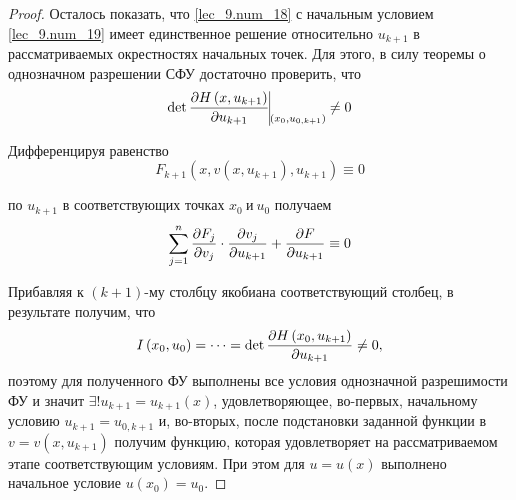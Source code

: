 \documentclass[../../main.tex]{subfiles}
\begin{document}
\begin{proof}
    Осталось показать, что \eqref{lec_9.num_18} с начальным
    условием \eqref{lec_9.num_19} имеет единственное решение относительно 
    $u_{k+1}$ в рассматриваемых окрестностях начальных
    точек. Для этого, в силу теоремы о однозначном разрешении СФУ
    достаточно проверить, что
    \begin{equation}
    \label{lec_9.num_20}
    \det\pderiv{H\left(x, u_{k+1}\right)}{u_{k+1}} 
    \vline\underset{\left(x_0, u_{0,k+1}\right)}{} \neq 0
    \end{equation}
    
    Дифференцируя равенство
    \begin{equation}
    \label{lec_9.num_21}
    F_{k+1}\left(x, v\left(x, u_{k+1}\right), 
    u_{k+1}\right) \equiv 0
    \end{equation}
    
    по $u_{k+1}$ в соответствующих точках $x_0\ \text{и}\ u_0$
    получаем
    \begin{equation}
        \label{lec_9.num_22}
        \sum_{j = 1}^{n}
        \frac{\partial F_j}{\partial v_j} \cdot \frac{\partial v_j}{\partial u_{k+1}} + 
        \frac{\partial F}{\partial u_{k+1}} \equiv 0
    \end{equation}
    
    Прибавляя к $\left(k + 1\right)$-му столбцу 
    якобиана соответствующий столбец, в результате
    получим, что 
    \[I\left(x_0, u_0\right)= \dots = 
    \det\frac{\partial H\left(x_0,u_{k+1}\right)}{\partial u_{k+1}} \neq 0,\]
    поэтому для полученного ФУ выполнены все условия 
    однозначной разрешимости ФУ и значит 
    $\exists! u_{k+1} = u_{k+1}\left(x\right)$, 
    удовлетворяющее, во-первых, начальному условию
    $u_{k+1} = u_{0,k+1}$ и, во-вторых, после подстановки
    заданной функции в
    $v = v\left(x, u_{k+1}\right)$ получим функцию,
    которая удовлетворяет на рассматриваемом этапе
    соответствующим условиям.
    При этом для $u = u\left(x\right)$ выполнено начальное
    условие $u\left(x_0\right) = u_0$.
\end{proof}
\end{document}
